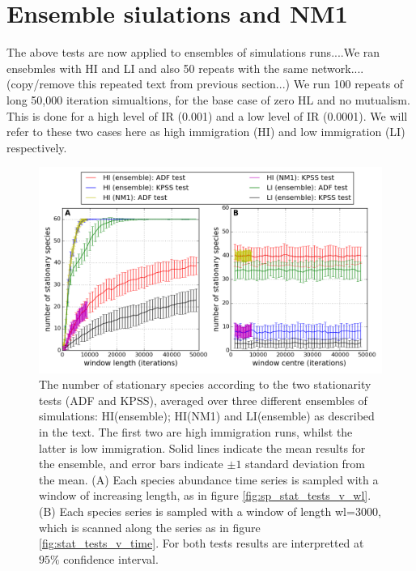 \newpage
\section{Ensemble siulations and NM1}
\label{sec:ensemble}

The above tests are now applied to ensembles of simulations runs....We ran ensebmles with HI and LI and also 50 repeats with the same network....(copy/remove this repeated text from previous section...) We run 100 repeats of long 50,000 iteration simualtions, for the base case of zero HL and no mutualism. This is done for a high level of IR (0.001) and a low level of IR (0.0001). We will refer to these two cases here as high immigration (HI) and low immigration (LI) respectively. 


\begin{figure}[h]
	\centering
	\includegraphics[width=1.0\linewidth]{"./chapters/chapter04b/figures/hi_v_li_net7_ensemble"}
    \caption{The number of stationary species according to the two stationarity tests (ADF and KPSS), averaged over three different ensembles of simulations: HI(ensemble); HI(NM1) and LI(ensemble)  as described in the text. The first two are high immigration runs, whilst the latter is low immigration. Solid lines indicate the mean results for the ensemble, and error bars indicate $\pm 1$ standard deviation from the mean. (A) Each species abundance time series is sampled with a window of increasing length, as in figure \ref{fig:sp_stat_tests_v_wl}. (B) Each species series is sampled with a window of length wl=$3000$, which is scanned along the series as in figure \ref{fig:stat_tests_v_time}. For both tests results are interpretted at $95\%$ confidence interval.}    
    \label{fig:hi_v_li_net7_ensemble}
\end{figure}


